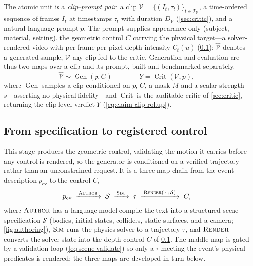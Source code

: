 The atomic unit is a \emph{clip--prompt pair}: a clip
$\mathcal{V}=\{(I_t,\tau_t)\}_{t\in\mathcal{T}_{\mathcal V}}$, a time-ordered sequence of frames $I_t$
at timestamps $\tau_t$ with duration $D_{\mathcal V}$ (\cref{sec:critic}), and a natural-language
prompt $p$. The prompt supplies appearance only (subject, material, setting), the geometric control
$C$ carrying the physical target---a solver-rendered video with per-frame per-pixel depth intensity
$C_t(u)$ (\cref{sec:gen-control}); $\hat{\mathcal{V}}$ denotes a generated sample, $\mathcal{V}$ any
clip fed to the critic. Generation and evaluation are thus two maps over a clip and its prompt, built
and benchmarked separately,
\begin{equation}
  \hat{\mathcal{V}}\sim\operatorname{Gen}(p,C)
  \qquad\qquad
  Y=\operatorname{Crit}(\mathcal{V},p) ,
  \label{eq:gen-crit-maps}
\end{equation}
where $\operatorname{Gen}$ samples a clip conditioned on $p$, $C$, a mask $M$ and a scalar strength
$s$---asserting no physical fidelity---and $\operatorname{Crit}$ is the auditable critic \PhyReAct{}
of \cref{sec:critic}, returning the clip-level verdict $Y$ (\cref{eq:claim-clip-rollup}).

\subsection{From specification to registered control}\label{sec:gen-control}

This stage produces the geometric control, validating the motion it carries before any control is
rendered, so the generator is conditioned on a verified trajectory rather than an unconstrained
request. It is a three-map chain from the event description $p_{\mathrm{ev}}$ to the control $C$,
\begin{equation}
p_{\mathrm{ev}}
\;\xrightarrow{\;\textsc{Author}\;}\; \mathcal{S}
\;\xrightarrow{\;\textsc{Sim}\;}\; \tau
\;\xrightarrow{\;\textsc{Render}(\,\cdot\,;\,\mathcal{S})\;}\; C,
\label{eq:control-chain}
\end{equation}
where $\textsc{Author}$ has a language model compile the text into a structured scene specification
$\mathcal{S}$ (bodies, initial states, colliders, static surfaces, and a camera; \cref{fig:authoring}),
$\textsc{Sim}$ runs the physics solver to a trajectory $\tau$, and $\textsc{Render}$ converts the
solver state into the depth control $C$ of \cref{sec:gen-control}. The middle map is gated by a
validation loop (\cref{eq:scene-validate}) so only a $\tau$ meeting the event's physical predicates is
rendered; the three maps are developed in turn below.

